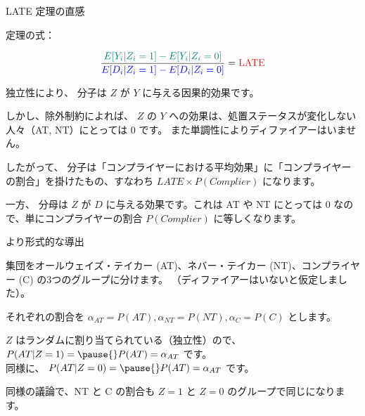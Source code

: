 \documentclass[11pt,handout]{beamer}
\newenvironment{wideitemize}{\itemize\addtolength{\itemsep}{10pt}}{\enditemize}
\begin{document}
\begin{frame}{LATE 定理の直感}
\begin{wideitemize}
	\item
	定理の式：
	
	$$ \dfrac{ \color{teal} E[Y_i | Z_i = 1] - E[Y_i | Z_i = 0 ]  }{  \color{blue} E[D_i | Z_i = 1] - E[D_i | Z_i = 0 ]   }  = {\color{red} \text{LATE} } $$
	
	\pause
	\item
	独立性により、{\color{teal} 分子}は $Z$ が $Y$ に与える因果的効果です。
	
	\pause
	\item
	しかし、除外制約によれば、 $Z$ の $Y$ への効果は、処置ステータスが変化しない人々（AT, NT）にとっては 0 です。 \pause また単調性によりディファイアーはいません。
	
	\pause
	\item
	したがって、{\color{teal} 分子}は「コンプライヤーにおける平均効果」に「コンプライヤーの割合」を掛けたもの、すなわち {\color{teal}  $LATE \times P(Complier)$ } になります。
	
	\pause
	\item
	一方、{\color{blue} 分母}は $Z$ が $D$ に与える効果です。これは AT や NT にとっては 0 なので、単にコンプライヤーの割合 {\color{blue}  $P(Complier)$} に等しくなります。
	
\end{wideitemize}	
\end{frame}


\begin{frame}{より形式的な導出}

\begin{wideitemize}
	\item
	集団をオールウェイズ・テイカー (AT)、ネバー・テイカー (NT)、コンプライヤー (C) の3つのグループに分けます。 \pause （ディファイアーはいないと仮定しました）。
	
	\item
	それぞれの割合を $\alpha_{AT} = P(AT), \alpha_{NT} = P(NT), \alpha_{C} = P(C)$ とします。
	
	\pause
	\item
	$Z$ はランダムに割り当てられている（独立性）ので、
	$P(AT |  Z = 1) =\pause{} P(AT) = \alpha_{AT}$ です。 \\ \pause
	同様に、 $P(AT |  Z = 0) =\pause{} P(AT) = \alpha_{AT}$ です。
	
	\pause
	\item
	同様の議論で、NT と C の割合も $Z=1$ と $Z=0$ のグループで同じになります。
\end{wideitemize}	
	
\end{frame}
\end{document}
